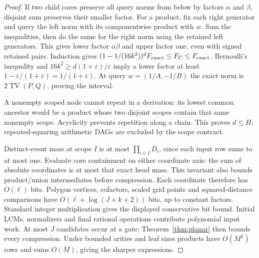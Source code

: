 \documentclass[11pt]{article}
\newcommand{\TV}{\operatorname{TV}}
\begin{document}
\begin{proof}
If two child cores preserve all query norms from below by factors $\alpha$
and $\beta$, disjoint sum preserves their smaller factor. For a product,
fix each right generator and query the left norm with its componentwise
product with $w$. Sum the inequalities, then do the same for the right
norm using the retained left generators. This gives lower factor
$\alpha\beta$ and upper factor one, even with signed retained pairs.
Induction gives $(1-1/(16k^2))^d F_{\rm exact}\leq F_C\leq F_{\rm exact}$.
Bernoulli's inequality and $16k^2\geq d(1+\varepsilon)/\varepsilon$ imply a
lower factor at least $1-\varepsilon/(1+\varepsilon)=1/(1+\varepsilon)$.
At query $w=(1/A,-1/B)$ the exact norm is $2\TV(P,Q)$, proving the interval.

A nonempty scoped node cannot repeat in a derivation: its lowest common
ancestor would be a product whose two disjoint scopes contain that same
nonempty scope. Acyclicity prevents repetition along a chain. This proves
$d\leq H$; repeated-squaring arithmetic DAGs are excluded by the scope contract.

Distinct-event mass at scope $I$ is at most $\prod_{i\in I}D_i$, since each
input row sums to at most one. Evaluate core containment on either coordinate
axis: the sum of absolute coordinates is at most that exact head mass.
This invariant also bounds product/union intermediates before compression.
Each coordinate therefore has $O(\ell)$ bits. Polygon vertices, cofactors,
scaled grid points and squared-distance comparisons have
$O(\ell+\log(J+k+2))$ bits, up to constant factors. Standard integer
multiplication gives the displayed conservative bit bound. Initial LCMs,
normalizers and final rational operations contribute polynomial input work.
At most $J$ candidates occur at a gate; Theorem~\ref{thm:planar} then bounds
every compression. Under bounded arities and leaf sizes products have $O(M^2)$
rows and sums $O(M)$, giving the sharper expressions.
\end{proof}
\end{document}
